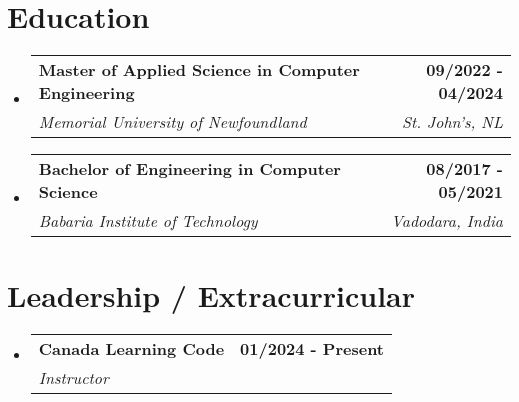 \documentclass[letterpaper,11pt]{article}
\makeatletter
\newcommand{\resumeSubheading}[4]{
  \vspace{-2pt}\item
    \begin{tabular*}{1.0\textwidth}[t]{l@{\extracolsep{\fill}}r}
      \textbf{#1} & \textbf{\small #2} \\
      \textit{\small#3} & \textit{\small #4} \\
    \end{tabular*}\vspace{-7pt}
}
\newcommand{\resumeSubHeadingListStart}{\begin{itemize}[leftmargin=0.0in, label={}]}
\newcommand{\resumeSubHeadingListEnd}{\end{itemize}}
\makeatother
\begin{document}
\section{Education}
\resumeSubHeadingListStart
\resumeSubheading
{Master of Applied Science in Computer Engineering}{09/2022 - 04/2024}
{Memorial University of Newfoundland}{St. John's, NL}
\resumeSubheading
{Bachelor of Engineering in Computer Science}{08/2017 - 05/2021}
{Babaria Institute of Technology}{Vadodara, India}
\resumeSubHeadingListEnd
\section{Leadership / Extracurricular}
    \resumeSubHeadingListStart
        \resumeSubheading{Canada Learning Code}{01/2024 - Present}{Instructor}{}
    \resumeSubHeadingListEnd
\end{document}
